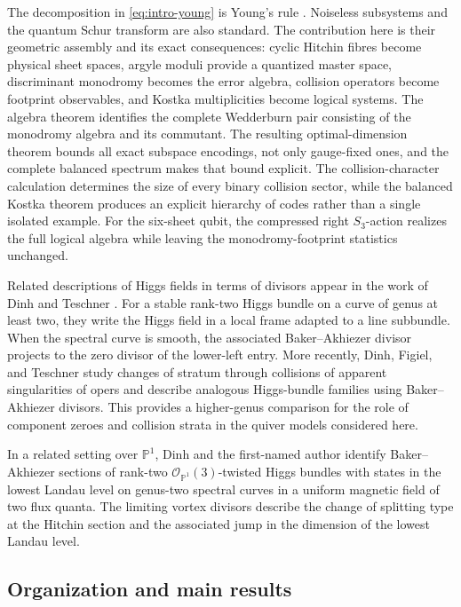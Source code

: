 \documentclass[11pt]{article}
\theoremstyle{definition}
\theoremstyle{remark}
\newcommand{\Pp}{\mathbb P}
\newcommand{\cO}{\mathcal O}
\begin{document}
The decomposition in \eqref{eq:intro-young} is Young's rule \cite{FultonYoungTableaux1997,Sagan2001}.  Noiseless subsystems \cite{KribsLaflammePoulinLesosky2006} and the quantum Schur transform \cite{BaconChuangHarrow2006} are also standard.  The contribution here is their geometric assembly and its exact consequences: cyclic Hitchin fibres become physical sheet spaces, argyle moduli provide a quantized master space, discriminant monodromy becomes the error algebra, collision operators become footprint observables, and Kostka multiplicities become logical systems.  The algebra theorem identifies the complete Wedderburn pair consisting of the monodromy algebra and its commutant.  The resulting optimal-dimension theorem bounds all exact subspace encodings, not only gauge-fixed ones, and the complete balanced spectrum makes that bound explicit.  The collision-character calculation determines the size of every binary collision sector, while the balanced Kostka theorem produces an explicit hierarchy of codes rather than a single isolated example.  For the six-sheet qubit, the compressed right $S_3$-action realizes the full logical algebra while leaving the monodromy-footprint statistics unchanged.

Related descriptions of Higgs fields in terms of divisors appear in the work of Dinh and Teschner \cite{DinhTeschner2023}.  For a stable rank-two Higgs bundle on a curve of genus at least two, they write the Higgs field in a local frame adapted to a line subbundle.  When the spectral curve is smooth, the associated Baker--Akhiezer divisor projects to the zero divisor of the lower-left entry.  More recently, Dinh, Figiel, and Teschner \cite{DinhFigielTeschner2026} study changes of stratum through collisions of apparent singularities of opers and describe analogous Higgs-bundle families using Baker--Akhiezer divisors.  This provides a higher-genus comparison for the role of component zeroes and collision strata in the quiver models considered here.

In a related setting over $\Pp^1$, Dinh and the first-named author \cite{DinhRayan2026} identify Baker--Akhiezer sections of rank-two $\cO_{\Pp^1}(3)$-twisted Higgs bundles with states in the lowest Landau level on genus-two spectral curves in a uniform magnetic field of two flux quanta.  The limiting vortex divisors describe the change of splitting type at the Hitchin section and the associated jump in the dimension of the lowest Landau level.

\subsection*{Organization and main results}
\end{document}
